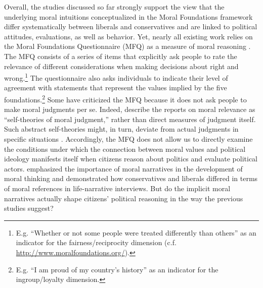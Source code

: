 \documentclass[12pt]{article}
\begin{document}
Overall, the studies discussed so far strongly support the view that the underlying moral intuitions conceptualized in the Moral Foundations framework differ systematically between liberals and conservatives and are linked to political attitudes, evaluations, as well as behavior. Yet, nearly all existing work relies on the Moral Foundations Questionnaire (MFQ) as a measure of moral reasoning \citep[but see][]{clifford2014linking}. The MFQ consists of a series of items that explicitly ask people to rate the relevance of different considerations when making decisions about right and wrong.\footnote{E.g. ``Whether or not some people were treated differently than others'' as an indicator for the fairness/reciprocity dimension (c.f. \url{http://www.moralfoundations.org/}).} The questionnaire also asks individuals to indicate their level of agreement with statements that represent the values implied by the five foundations.\footnote{E.g. ``I am proud of my country’s history'' as an indicator for the ingroup/loyalty dimension.} Some have criticized the MFQ because it does not ask people to make moral judgments per se. Indeed, \citet[1031]{graham2009liberals} describe the reports on moral relevance as ``self-theories of moral judgment,'' rather than direct measures of judgment itself. Such abstract self-theories might, in turn, deviate from actual judgments in specific situations \citep[see][for an alternative way to measure moral judgment]{clifford2015moral}. Accordingly, the MFQ does not allow us to directly examine the conditions under which the connection between moral values and political ideology manifests itself when citizens reason about politics and evaluate political actors. \citet{haidt2008moral} emphasized the importance of moral narratives in the development of moral thinking and \citet{mcadams2008family} demonstrated how conservatives and liberals differed in terms of moral references in life-narrative interviews. But do the implicit moral narratives actually shape citizens' political reasoning in the way the previous studies suggest?
\end{document}
